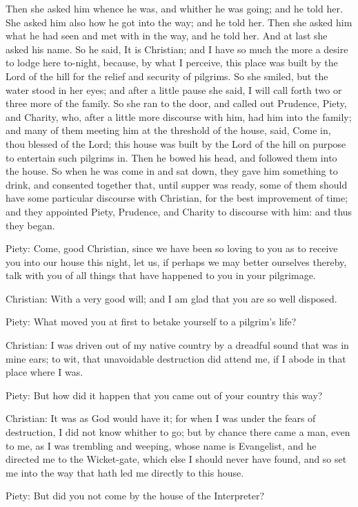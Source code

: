 Then she asked him whence he was, and whither he was going; and he told her. She asked him also how he got into the way; and he told her. Then she asked him what he had seen and met with in the way, and he told her. And at last she asked his name. So he said, It is Christian; and I have so much the more a desire to lodge here to-night, because, by what I perceive, this place was built by the Lord of the hill for the relief and security of pilgrims. So she smiled, but the water stood in her eyes; and after a little pause she said, I will call forth two or three more of the family. So she ran to the door, and called out Prudence, Piety, and Charity, who, after a little more discourse with him, had him into the family; and many of them meeting him at the threshold of the house, said, Come in, thou blessed of the Lord; this house was built by the Lord of the hill on purpose to entertain such pilgrims in. Then he bowed his head, and followed them into the house. So when he was come in and sat down, they gave him something to drink, and consented together that, until supper was ready, some of them should have some particular discourse with Christian, for the best improvement of time; and they appointed Piety, Prudence, and Charity to discourse with him: and thus they began.

Piety: Come, good Christian, since we have been so loving to you as to receive you into our house this night, let us, if perhaps we may better ourselves thereby, talk with you of all things that have happened to you in your pilgrimage.

Christian: With a very good will; and I am glad that you are so well disposed.

Piety: What moved you at first to betake yourself to a pilgrim's life?

Christian: I was driven out of my native country by a dreadful sound that was in mine ears; to wit, that unavoidable destruction did attend me, if I abode in that place where I was.

Piety: But how did it happen that you came out of your country this way?

Christian: It was as God would have it; for when I was under the fears of destruction, I did not know whither to go; but by chance there came a man, even to me, as I was trembling and weeping, whose name is Evangelist, and he directed me to the Wicket-gate, which else I should never have found, and so set me into the way that hath led me directly to this house.

Piety: But did you not come by the house of the Interpreter?

